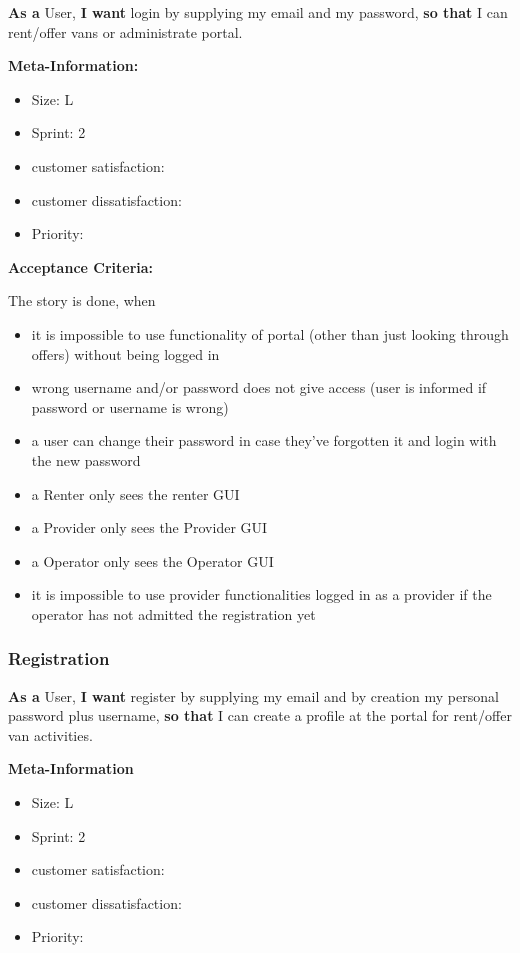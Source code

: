 \textbf{As a} User,\hfill\break
\textbf{I want} login by supplying my email and my password,\hfill\break
\textbf{so that} I can rent/offer vans or administrate portal.

\textbf{Meta-Information:}
\begin{itemize}
    \item Size: L
    \item Sprint: 2
    \item customer satisfaction:
    \item customer dissatisfaction:
    \item Priority:
\end{itemize}

\textbf{Acceptance Criteria:}

The story is done, when
\begin{itemize}
    \item it is impossible to use functionality of portal (other than just looking through offers) without being logged in
    \item wrong username and/or password does not give access (user is informed if password or username is wrong)
    \item a user can change their password in case they've forgotten it and login with the new password
    \item a Renter only sees the renter GUI
    \item a Provider only sees the Provider GUI
    \item a Operator only sees the Operator GUI
    \item it is impossible to use provider functionalities logged in as a provider if the operator has not admitted the registration yet
\end{itemize}

\subsubsection{Registration}

\textbf{As a} User,\hfill\break
\textbf{I want} register by supplying my email and by creation my personal password plus username,\hfill\break
\textbf{so that} I can create a profile at the portal for rent/offer van activities.

\textbf{Meta-Information}
\begin{itemize}
    \item Size: L
    \item Sprint: 2
    \item customer satisfaction:
    \item customer dissatisfaction:
    \item Priority:
\end{itemize}

